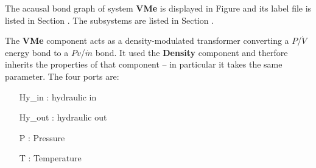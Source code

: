 

   The acausal bond graph of system \textbf{VMe} is
   displayed in Figure  and its label
   file is listed in Section .
   The subsystems are listed in Section .

The \textbf{VMe} component acts as a density-modulated transformer
converting a $P$/$\dot V$ energy bond to a $Pv$/$\dot m$ bond. It used
the \textbf{Density} component and therfore inherits the properties of
that component -- in particular it takes the same parameter. The four
ports are:

\begin{itemize}
\item [Hy_in]: hydraulic in
\item [Hy_out]: hydraulic out
\item [P]: Pressure
\item [T]: Temperature
\end{itemize}

